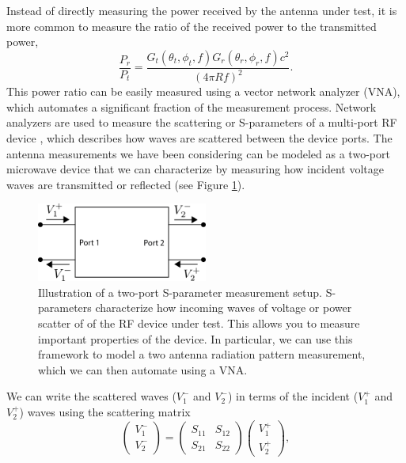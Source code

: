 Instead of directly measuring the power received by the antenna under test, it is more common to measure the ratio of the received power to the transmitted power,
\begin{equation}
    \frac{P_r}{P_t} = \frac{G_t(\theta_t,\phi_t,f)G_r(\theta_r,\phi_r,f)c^2}{(4\pi Rf)^2}.
\end{equation}
This power ratio can be easily measured using a vector network analyzer (VNA), which automates a significant fraction of the measurement process. Network analyzers are used to measure the scattering or S-parameters of a multi-port RF device \cite{pozar}, which describes how waves are scattered between the device ports. The antenna measurements we have been considering can be modeled as a two-port microwave device that we can characterize by measuring how incident voltage waves are transmitted or reflected (see Figure \ref{fig:2port-scattering}).
\begin{figure}[htbp]
    \centering
    \includegraphics[width=0.5\textwidth]{figs/Chapter-5/230429_2port_scattering_figure.png}
    \caption{Illustration of a two-port S-parameter measurement setup. S-parameters characterize how incoming waves of voltage or power scatter of of the RF device under test. This allows you to measure important properties of the device. In particular, we can use this framework to model a two antenna radiation pattern measurement, which we can then automate using a VNA. }
    \label{fig:2port-scattering}
\end{figure}
We can write the scattered waves ($V_1^-$ and $V_2^-$) in terms of the incident ($V_1^+$ and $V_2^+$) waves using the scattering matrix
\begin{equation}
    \begin{pmatrix}
        V_1^-\\
        V_2^-
    \end{pmatrix} = 
    \begin{pmatrix}
        S_{11}&S_{12}\\
        S_{21}&S_{22}
    \end{pmatrix}
    \begin{pmatrix}
        V_1^+\\
        V_2^+
    \end{pmatrix},
\end{equation}

